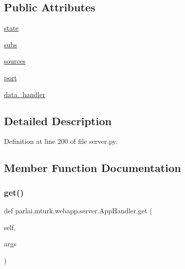 \subsection*{Public Attributes}
\begin{DoxyCompactItemize}
\item 
\hyperlink{classparlai_1_1mturk_1_1webapp_1_1server_1_1AppHandler_a7193d2e1fc8447f00be8ab6374e43f32}{state}
\item 
\hyperlink{classparlai_1_1mturk_1_1webapp_1_1server_1_1AppHandler_a1c61eec19a28f77d438777da6e034cbc}{subs}
\item 
\hyperlink{classparlai_1_1mturk_1_1webapp_1_1server_1_1AppHandler_ae517a50ac0cfc7b33a5aafdc2984c71a}{sources}
\item 
\hyperlink{classparlai_1_1mturk_1_1webapp_1_1server_1_1AppHandler_a211ede0441daaf339d7b12bf119b5858}{port}
\item 
\hyperlink{classparlai_1_1mturk_1_1webapp_1_1server_1_1AppHandler_ac635a7095f1cf851b4b33cca5d6d081b}{data\+\_\+handler}
\end{DoxyCompactItemize}


\subsection{Detailed Description}


Definition at line 200 of file server.\+py.



\subsection{Member Function Documentation}
\mbox{\label{classparlai_1_1mturk_1_1webapp_1_1server_1_1AppHandler_a67f91de7041df784c72e37757e346a94}} 
\subsubsection{\texorpdfstring{get()}{get()}}
{\footnotesize\ttfamily def parlai.\+mturk.\+webapp.\+server.\+App\+Handler.\+get (\begin{DoxyParamCaption}\item[{}]{self,  }\item[{}]{args }\end{DoxyParamCaption})}



